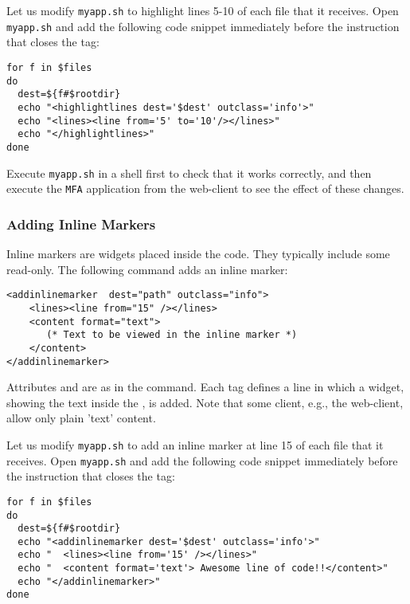 Let us modify \texttt{myapp.sh} to highlight lines 5-10 of each file
that it receives. Open \texttt{myapp.sh} and add the following code
snippet immediately before the instruction that closes the
 tag:

\medskip
\begin{lstlisting}[style=script]
for f in $files 
do
  dest=${f#$rootdir}
  echo "<highlightlines dest='$dest' outclass='info'>"
  echo "<lines><line from='5' to='10'/></lines>"
  echo "</highlightlines>"
done
\end{lstlisting}

\medskip
\noindent
Execute \texttt{myapp.sh} in a shell first to check that it works
correctly, and then execute the \texttt{MFA} application from the
web-client to see the effect of these changes.

\subsubsection{Adding Inline Markers}

Inline markers are widgets placed inside the code. They typically
include some read-only. The following command adds an inline marker:

\medskip
\begin{lstlisting}
<addinlinemarker  dest="path" outclass="info"> 
    <lines><line from="15" /></lines>
    <content format="text">
       (* Text to be viewed in the inline marker *)
    </content>
</addinlinemarker>
\end{lstlisting}

\medskip
\noindent
Attributes  and  are as in the 
command. Each  tag defines a line in which a widget, showing
the text inside the , is added. Note that some client,
e.g., the web-client, allow only plain 'text' content.

Let us modify \texttt{myapp.sh} to add an inline marker at line 15 of
each file that it receives. Open \texttt{myapp.sh} and add the
following code snippet immediately before the instruction that closes
the  tag:

\medskip
\begin{lstlisting}[style=script]for f in $files 
do
  dest=${f#$rootdir}
  echo "<addinlinemarker dest='$dest' outclass='info'>"
  echo "  <lines><line from='15' /></lines>"
  echo "  <content format='text'> Awesome line of code!!</content>"
  echo "</addinlinemarker>"
done
\end{lstlisting}

